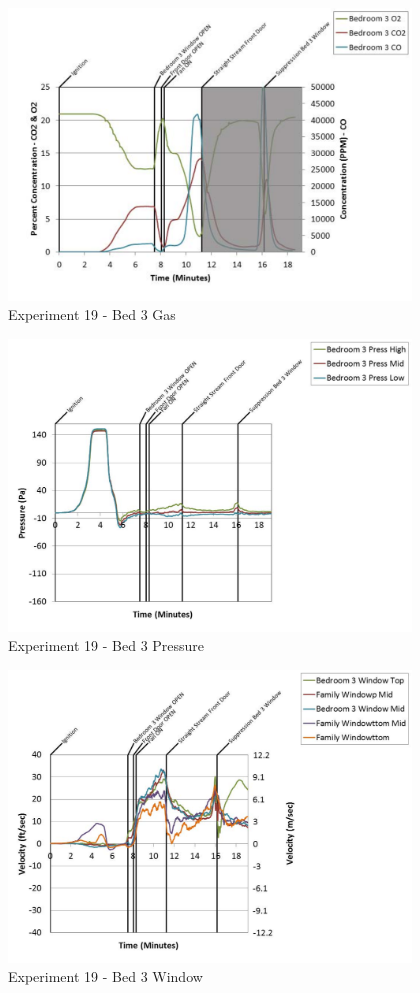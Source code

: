 \documentclass{article}
\begin{document}
\begin{appendices}
	\clearpage

	\begin{figure}[h!]
		\centering
		\includegraphics[height=3.05in]{0_Images/Results_Charts/Exp_19_Charts/Bed3Gas.pdf}
		\caption{Experiment 19 - Bed 3 Gas}
	\end{figure}
 

	\begin{figure}[h!]
		\centering
		\includegraphics[height=3.05in]{0_Images/Results_Charts/Exp_19_Charts/Bed3Pressure.pdf}
		\caption{Experiment 19 - Bed 3 Pressure}
	\end{figure}
 
	\clearpage

	\begin{figure}[h!]
		\centering
		\includegraphics[height=3.05in]{0_Images/Results_Charts/Exp_19_Charts/Bed3Window.pdf}
		\caption{Experiment 19 - Bed 3 Window}
	\end{figure}
 


\end{appendices}
\end{document}
